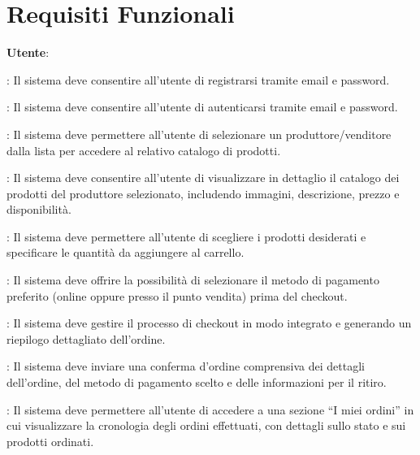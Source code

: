 \section{Requisiti Funzionali}

\begin{rfenum}
    \item \textbf{Utente}:
        \begin{rfenum}
            \item : Il sistema deve consentire all'utente di registrarsi tramite email e password.
            \item : Il sistema deve consentire all'utente di autenticarsi tramite email e password.
            \item : Il sistema deve permettere all'utente di selezionare un produttore/venditore dalla lista per accedere al relativo catalogo di prodotti.
            \item : Il sistema deve consentire all'utente di visualizzare in dettaglio il catalogo dei prodotti del produttore selezionato, includendo immagini, descrizione, prezzo e disponibilità.
            \item : Il sistema deve permettere all'utente di scegliere i prodotti desiderati e specificare le quantità da aggiungere al carrello.          
            \item : Il sistema deve offrire la possibilità di selezionare il metodo di pagamento preferito (online oppure presso il punto vendita) prima del checkout.
            \item : Il sistema deve gestire il processo di checkout in modo integrato e generando un riepilogo dettagliato dell'ordine.
            \item : Il sistema deve inviare una conferma d'ordine comprensiva dei dettagli dell'ordine, del metodo di pagamento scelto e delle informazioni per il ritiro.
            \item : Il sistema deve permettere all'utente di accedere a una sezione “I miei ordini” in cui visualizzare la cronologia degli ordini effettuati, con dettagli sullo stato e sui prodotti ordinati.

        \end{rfenum}
        

\end{rfenum}
